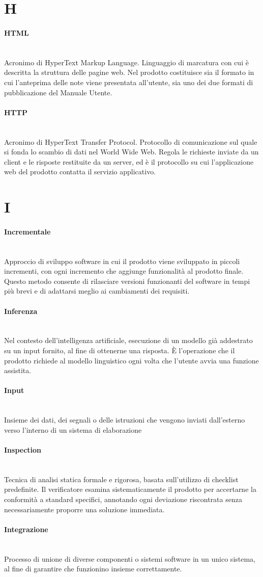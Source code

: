 \documentclass[a4paper, 10pt, colorlinks=true, linkcolor=black, urlcolor=blue, citecolor=blue, hidelinks]{article}
\newcommand{\glossaryterm}[2]{
    \paragraph{#1 \label{term:#1}} \mbox{} \\
    #2
    \vspace{0.5em}
}
\begin{document}
\newpage

\section*{H}

\glossaryterm{HTML}{Acronimo di HyperText Markup Language. Linguaggio di marcatura con cui è descritta la struttura delle pagine web. Nel prodotto costituisce sia il formato in cui l'anteprima delle note viene presentata all'utente, sia uno dei due formati di pubblicazione del Manuale Utente.}

\glossaryterm{HTTP}{Acronimo di HyperText Transfer Protocol. Protocollo di comunicazione sul quale si fonda lo scambio di dati nel World Wide Web. Regola le richieste inviate da un client e le risposte restituite da un server, ed è il protocollo su cui l'applicazione web del prodotto contatta il servizio applicativo.}

\newpage

\section*{I}

\glossaryterm{Incrementale}{Approccio di sviluppo software in cui il prodotto viene sviluppato in piccoli incrementi, con ogni incremento che aggiunge funzionalità al prodotto finale. Questo metodo consente di rilasciare versioni funzionanti del software in tempi più brevi e di adattarsi meglio ai cambiamenti dei requisiti.}

\glossaryterm{Inferenza}{Nel contesto dell'intelligenza artificiale, esecuzione di un modello già addestrato su un input fornito, al fine di ottenerne una risposta. È l'operazione che il prodotto richiede al modello linguistico ogni volta che l'utente avvia una funzione assistita.}

\glossaryterm{Input}{Insieme dei dati, dei segnali o delle istruzioni che vengono inviati dall'esterno verso l'interno di un sistema di elaborazione}

\glossaryterm{Inspection}{Tecnica di analisi statica formale e rigorosa, basata sull'utilizzo di checklist predefinite. Il verificatore esamina sistematicamente il prodotto per accertarne la conformità a standard specifici, annotando ogni deviazione riscontrata senza necessariamente proporre una soluzione immediata.}

\glossaryterm{Integrazione}{Processo di unione di diverse componenti o sistemi software in un unico sistema, al fine di garantire che funzionino insieme correttamente.}
\end{document}
